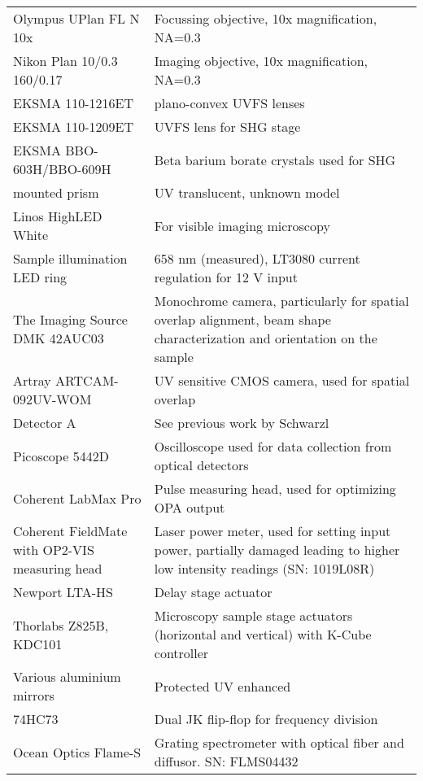 \documentclass[twoside,openright,listof=numbered]{scrreprt}
\begin{document}
\begin{longtable}{p{}p{}}
    Olympus UPlan FL N 10x & Focussing objective, 10x magnification, NA=0.3 \\
    Nikon Plan 10/0.3 160/0.17 & Imaging objective, 10x magnification, NA=0.3 \\
    EKSMA 110-1216ET& plano-convex UVFS lenses\\
    EKSMA 110-1209ET& UVFS lens for SHG stage\\
    EKSMA BBO-603H/BBO-609H & Beta barium borate crystals used for SHG\\
    mounted prism & UV translucent, unknown model\\
    Linos HighLED White & For visible imaging microscopy \\
    Sample illumination LED ring & 658 nm (measured), LT3080 current regulation for 12 V input \\
    The Imaging Source DMK 42AUC03 & Monochrome camera, particularly for spatial overlap alignment, beam shape characterization and orientation on the sample \\
    Artray ARTCAM-092UV-WOM & UV sensitive CMOS camera, used for spatial overlap\\
    Detector A & See previous work by Schwarzl \cite{Schwarzl2022} \\
    Picoscope 5442D & Oscilloscope used for data collection from optical detectors \\
    Coherent LabMax Pro & Pulse measuring head, used for optimizing OPA output \\
    Coherent FieldMate with OP2-VIS measuring head & Laser power meter, used for setting input power, partially damaged leading to higher low intensity readings (SN: 1019L08R) \\
    Newport LTA-HS & Delay stage actuator \\
    Thorlabs Z825B, KDC101 & Microscopy sample stage actuators (horizontal and vertical) with K-Cube controller \\
    Various aluminium mirrors & Protected UV enhanced \\
    74HC73 & Dual JK flip-flop for frequency division\\
    Ocean Optics Flame-S & Grating spectrometer with optical fiber and diffusor. SN: FLMS04432 
\end{longtable}
\end{document}
